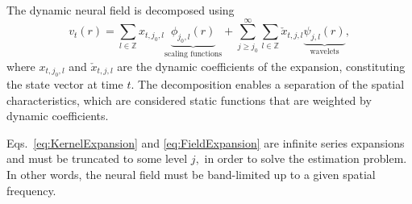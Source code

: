 \documentclass[review,authoryear,3p]{elsarticle}
\begin{document}
The dynamic neural field is decomposed using
\begin{equation}
 v_t\left(r\right)=\sum_{l \in \mathbb{Z}}x_{t,j_{0},l} \underbrace{\phi_{j_0,l}\left(r\right)}_{\text{scaling functions}} + \sum_{j\geq j_0}^{\infty} \sum_{l \in \mathbb{Z}} \check{x}_{t,j,l} \underbrace{\psi_{j,l}\left(r\right)}_{\text{wavelets}},
\label{eq:FieldExpansion}
\end{equation}
where $x_{t,j_{0},l}$ and $\check{x}_{t,j,l} $ are the dynamic coefficients of the expansion, constituting the state vector at time $t$. The decomposition enables a separation of the spatial characteristics, which are considered static functions that are weighted by dynamic coefficients.

Eqs.~\eqref{eq:KernelExpansion} and \eqref{eq:FieldExpansion} are infinite series expansions and must be truncated to some level $j,$ in order to solve the estimation problem. In other words, the neural field must be band-limited up to a given spatial frequency. 
\end{document}
